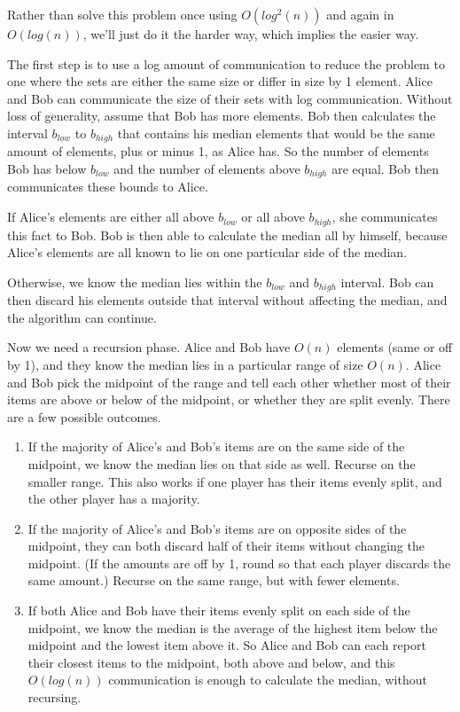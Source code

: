 \documentclass{article}
\newenvironment{problem}[2][Problem]{\begin{trivlist}
\item[\hskip \labelsep {\bfseries #1}\hskip \labelsep {\bfseries #2.}]}{\end{trivlist}}
\begin{document}
\begin{problem}{4}
  Rather than solve this problem once using $O(log^2(n))$ and again in
  $O(log(n))$, we'll just do it the harder way, which implies the
  easier way.
  
  The first step is to use a log amount of communication to reduce the
  problem to one where the sets are either the same size or differ in
  size by 1 element. Alice and Bob can
  communicate the size of their sets with log communication. Without
  loss of generality, assume that Bob has more elements. Bob then
  calculates the interval $b_{low}$ to $b_{high}$ that contains his
  median elements that would be the same amount of elements, plus or
  minus 1, as Alice has. So the number of elements Bob has below
  $b_{low}$ and the number of elements above $b_{high}$ are equal. Bob
  then communicates these bounds to Alice.

  If Alice's elements are either all above $b_{low}$ or all above
  $b_{high}$, she communicates this fact to Bob. Bob is then able to
  calculate the median all by himself, because Alice's elements are
  all known to lie on one particular side of the median.

  Otherwise, we know the median lies within the $b_{low}$ and
  $b_{high}$ interval. Bob can then discard his elements outside that
  interval without affecting the median, and the algorithm can
  continue.

  Now we need a recursion phase. Alice and Bob have $O(n)$
  elements (same or off by 1), and they know the median lies in a
  particular range of size $O(n)$. Alice and Bob pick the midpoint of
  the range and tell each other whether most of their items are above
  or below of the midpoint, or whether they are split evenly. There
  are a few possible outcomes.

  \begin{enumerate}
  \item If the majority of Alice's and Bob's items are on the same
    side of the midpoint, we know the median lies on that side as
    well. Recurse on the smaller range. This also works if one player
    has their items evenly split, and the other player has a majority.
  \item If the majority of Alice's and Bob's items are on opposite
    sides of the midpoint, they can both discard half of their items
    without changing the midpoint. (If the amounts are off by 1,
    round so that each player discards the same amount.) Recurse on
    the same range, but with fewer elements.
    \item If both Alice and Bob have their items evenly split on each
      side of the midpoint, we know the median is the average of the
      highest item below the midpoint and the lowest item above it. So
      Alice and Bob can each report their closest items to the
      midpoint, both above and below, and this $O(log(n))$ communication is enough
      to calculate the median, without recursing.
  \end{enumerate}


\end{problem}
\end{document}
